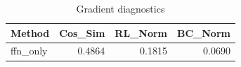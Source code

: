 \begin{table}[htbp]
\centering
\caption{Gradient diagnostics}
\label{tab:grad-diag}
\begin{tabular}{lrrr}
\toprule
\textbf{Method} & \textbf{Cos\_Sim} & \textbf{RL\_Norm} & \textbf{BC\_Norm} \\
\midrule
ffn\_only & 0.4864 & 0.1815 & 0.0690 \\
\bottomrule
\end{tabular}
\end{table}